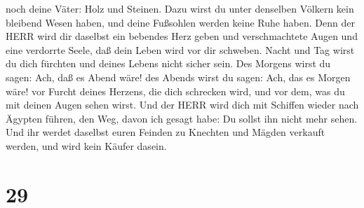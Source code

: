 noch deine Väter: Holz und Steinen.  Dazu wirst du unter
denselben Völkern kein bleibend Wesen haben, und deine Fußsohlen werden
keine Ruhe haben. Denn der HERR wird dir daselbst ein bebendes Herz
geben und verschmachtete Augen und eine verdorrte Seele, 
daß dein Leben wird vor dir schweben. Nacht und Tag wirst du dich
fürchten und deines Lebens nicht sicher sein.  Des Morgens
wirst du sagen: Ach, daß es Abend wäre! des Abends wirst du sagen: Ach,
das es Morgen wäre! vor Furcht deines Herzens, die dich schrecken wird,
und vor dem, was du mit deinen Augen sehen wirst.  Und der
HERR wird dich mit Schiffen wieder nach Ägypten führen, den Weg, davon
ich gesagt habe: Du sollst ihn nicht mehr sehen. Und ihr werdet daselbst
euren Feinden zu Knechten und Mägden verkauft werden, und wird kein
Käufer dasein.

\hypertarget{section-28}{%
\section{29}\label{section-28}}

